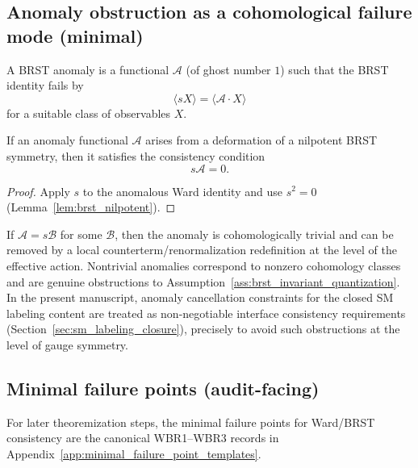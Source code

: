 \subsection{Anomaly obstruction as a cohomological failure mode (minimal)}

\begin{definition}\label{def:brst_anomaly_functional}
\MathTag A BRST anomaly is a functional $\mathcal{A}$ (of ghost number $1$) such that the BRST identity fails by
\[
\langle sX\rangle = \langle \mathcal{A}\cdot X\rangle
\]
for a suitable class of observables $X$.
\end{definition}

\begin{lemma}\label{lem:wess_zumino_consistency}
\MathTag If an anomaly functional $\mathcal{A}$ arises from a deformation of a nilpotent BRST symmetry, then it satisfies the consistency condition
\[
s\mathcal{A}=0.
\]
\end{lemma}
\begin{proof}
Apply $s$ to the anomalous Ward identity and use $s^2=0$ (Lemma~\ref{lem:brst_nilpotent}).
\end{proof}

\begin{remark}\label{rem:trivial_nontrivial_anomalies}
\AuditTag If $\mathcal{A}=s\mathcal{B}$ for some $\mathcal{B}$, then the anomaly is cohomologically trivial and can be removed by a local counterterm/renormalization redefinition at the level of the effective action.
Nontrivial anomalies correspond to nonzero cohomology classes and are genuine obstructions to Assumption~\ref{ass:brst_invariant_quantization}.
In the present manuscript, anomaly cancellation constraints for the closed SM labeling content are treated as non-negotiable interface consistency requirements (Section~\ref{sec:sm_labeling_closure}), precisely to avoid such obstructions at the level of gauge symmetry.
\end{remark}

\subsection{Minimal failure points (audit-facing)}

\AuditTag For later theoremization steps, the minimal failure points for Ward/BRST consistency are the canonical WBR1--WBR3 records in Appendix~\ref{app:minimal_failure_point_templates}.

